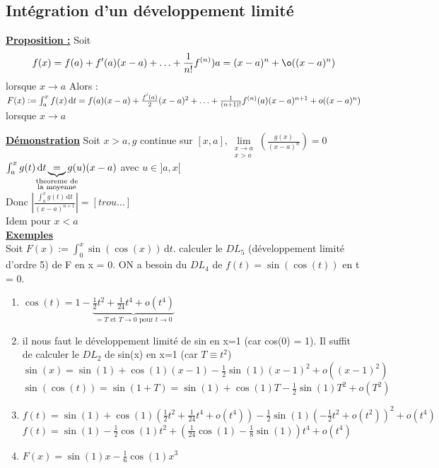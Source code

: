 \documentclass[12pt,a4paper]{article}
\newcommand{\limite}{\lim\limits_}
\newcommand{\llimite}[3]{\limite{\substack{#1 \\ #2}}\left(#3\right)}
\newcommand{\evid}[1]{\textbf{\underline{#1}}}
\newcommand{\pour}{\mbox{ pour }}
\newcommand{\intt}[3]{\ensuremath{\int_{#1}^{#2} #3 \, \mathrm dt}}
\begin{document}
{\subsection{Intégration d'un développement limité}
\begin{boite}
\evid{Proposition :} Soit
\begin{equation}
	f(x) = f(a) + f'(a)(x-a) + \ldots + \frac{1}{n!}f^{(n)})a=(x-a)^n + \o((x-a)^n)
\end{equation}
lorsque $x\to a$ Alors :\\
$F(x) := \int_a^x f(x) \, \mathrm dt \\
= f(a)(x-a) + \frac{f'(a)}{2}(x-a)^2 + \ldots +\frac{1}{(n+1)!}f^{(n)}(a) (x-a)^{n+1} + o((x-a)^n)$\\
lorsque $x\to a$
\end{boite}
\evid{Démonstration}
Soit $x > a, g$ continue sur $[x,a], \llimite{x\to a}{x>a}{\frac{g(x)}{(x-a)^n}} = 0$\\
$\int_a^x g(t) \, \mathrm dt \underbrace{=}_{\mathclap{\substack{\text{theoreme de}\\\text{la moyenne}}}} g(u)(x-a)$ avec $u \in ]a,x[$\\
Donc $\left| \frac{\int_a^xg(t)\, \mathrm dt}{(x-a)^{n+1}}\right| = [trou...]$\\
Idem pour $x<a$\\
\evid{Exemples}\\
Soit $F(x) := \intt{0}{x}{\sin(\cos(x))}$. calculer le $DL_5$ (développement limité d'ordre 5) de F en x = 0. ON a besoin du $DL_4$ de $f(t) = \sin(\cos(t))$ en t = 0.
\begin{enumerate}[label=\roman*)]
	\item $\cos(t) = 1- \underbrace{ \frac{1}{2}t^2 + \frac{1}{24} t^4 + o(t^4)}_{=T\mbox{ et }T \to 0 \pour t \to 0}$
	\item il nous faut le développement limité de sin en x=1 (car cos(0) = 1). Il suffit de calculer le $DL_2$ de sin(x) en x=1 (car $T \equiv t^2$)\\
	$\sin(x) = \sin(1) + \cos(1)(x-1) - \frac{1}{2}\sin(1)(x-1)^2 + o((x-1)^2)$\\
	$\sin(\cos(t)) = \sin(1+T) = \sin(1)+\cos(1)T - \frac{1}{2}\sin(1)T^2 + o(T^2)$
	\item $f(t) = \sin(1) +  \cos(1)(\frac{1}{2}t^2 + \frac{1}{24}t^4 + o(t^4)) - \frac{1}{2}\sin(1)(-\frac{1}{2}t^2 + o(t^2))^2 + o(t^4)$\\
	$f(t) =  \sin(1) - \frac{1}{2} \cos(1)t^2 + (\frac{1}{24}\cos(1) - \frac{1}{8} \sin(1))t^4 + o(t^4)$
	\item $F(x) = \sin(1)x - \frac{1}{6} \cos(1)x^3$
\end{enumerate}
}
\end{document}
